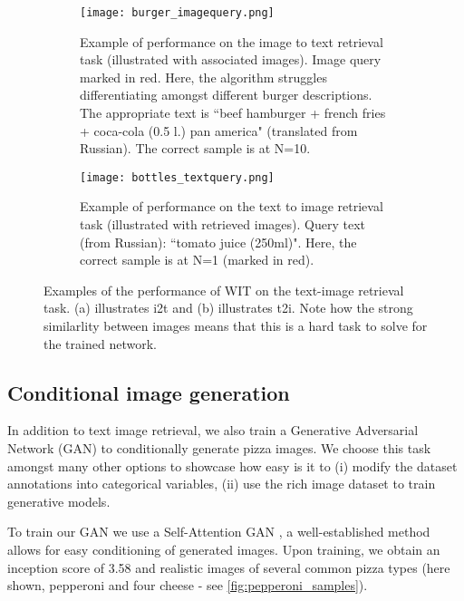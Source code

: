\documentclass[10pt,twocolumn,letterpaper]{article}
\begin{document}
\begin{figure}[htb]
        \centering
        \begin{subfigure}[b]{0.475\textwidth}
            \centering
            \texttt{[image: burger\_imagequery.png]}
            \label{fig:i2t_img}
                    \caption
        {Example of performance on the image to text retrieval task (illustrated with associated images). Image query marked in red. Here, the algorithm struggles differentiating amongst different burger descriptions. The appropriate text is ``beef hamburger + french fries + coca-cola (0.5 l.) pan america" (translated from Russian). The correct sample is at N=10.} 
        \end{subfigure}
\begin{subfigure}[b]{0.475\textwidth}  
            \centering 
            \texttt{[image: bottles\_textquery.png]}
                    \caption
        { Example of performance on the text to image retrieval task (illustrated with retrieved images). Query text (from Russian): ``tomato juice (250ml)". Here, the correct sample is at N=1 (marked in red). } 
            \label{fig:t2i_img}
        \end{subfigure}
       
        \caption
        {Examples of the performance of WIT on the text-image retrieval task. (a) illustrates i2t and (b) illustrates t2i. Note how the strong similarlity between images means that this is a hard task to solve for the trained network.   } 
        \label{fig:samples_retrieval}
    \end{figure}


\subsection{Conditional image generation}\label{sec:benchmark_gan}
In addition to text image retrieval, we also train a Generative Adversarial Network (GAN) to conditionally generate pizza images. We choose this task amongst many other options to showcase how easy is it to (i) modify the dataset annotations into categorical variables, (ii) use the rich image dataset to train generative models.

To train our GAN we use a Self-Attention GAN \cite{zhang2019self}, a well-established method allows for easy conditioning of generated images. Upon training, we obtain an inception score of 3.58 and realistic images of several common pizza types (here shown, pepperoni and four cheese - see \cref{fig:pepperoni_samples}).
\end{document}

